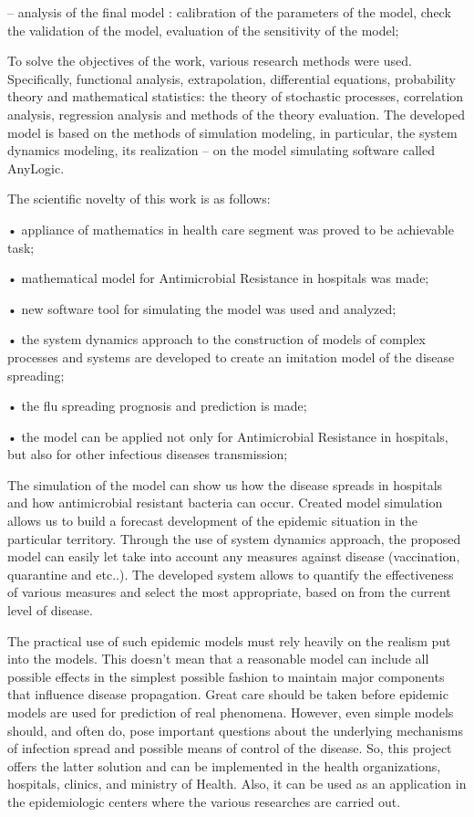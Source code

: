 –	analysis of the final model : calibration of the parameters of the model, check the validation of the model, evaluation of the sensitivity of the model;

To solve the objectives of the work, various research methods were used. Specifically, functional analysis, extrapolation, differential equations, probability theory and mathematical statistics: the theory of stochastic processes, correlation analysis, regression analysis and methods of the theory evaluation. The developed model is based on the methods of simulation modeling, in particular, the system dynamics modeling, its realization – on the model simulating software called AnyLogic.

The scientific novelty of this work is as follows:

•	appliance of mathematics in health care segment was proved to be achievable task;

•	mathematical model for Antimicrobial Resistance in hospitals was made;

•	new software tool for simulating the model was used and analyzed;

•	the system dynamics approach to the construction of models of complex processes and systems are developed to create an imitation model of the disease spreading;

•	the flu spreading prognosis and prediction is made;

•	the model can be applied not only for Antimicrobial Resistance in hospitals, but also for other infectious diseases transmission;

The simulation of the model can show us how the disease spreads in hospitals and how antimicrobial resistant bacteria can occur. Created model simulation allows us to build a forecast development of the epidemic situation in the particular territory. Through the use of system dynamics approach, the proposed model can easily let take into account any measures against disease (vaccination, quarantine and etc..). The developed system allows to quantify the effectiveness of various measures and select the most appropriate, based on from the current level of disease.

The practical use of such epidemic models must rely heavily on the realism put into the models. This doesn't mean that a reasonable model can include all possible effects in the simplest possible fashion to maintain major components that influence disease propagation. Great care should be taken before epidemic models are used for prediction of real phenomena. However, even simple models should, and often do, pose important questions about the underlying mechanisms of infection spread and possible means of control of the disease. So, this project offers the latter solution and can be implemented in the health organizations, hospitals, clinics, and ministry of Health. Also, it can be used as an application in the epidemiologic centers where the various researches are carried out.
